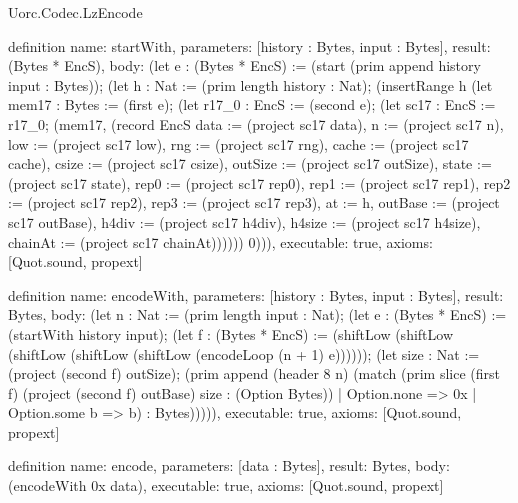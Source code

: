 \begin{lexlean}{Uorc.Codec.LzEncode}
\begin{semanticmodule}
definition{
  name: startWith,
  parameters: [history : Bytes, input : Bytes],
  result: (Bytes * EncS),
  body: (let e : (Bytes * EncS) := (start (prim append history input : Bytes)); (let h : Nat := (prim length history : Nat); (insertRange h (let mem17 : Bytes := (first e); (let r17_0 : EncS := (second e); (let sc17 : EncS := r17_0; (mem17, (record EncS {data := (project sc17 data), n := (project sc17 n), low := (project sc17 low), rng := (project sc17 rng), cache := (project sc17 cache), csize := (project sc17 csize), outSize := (project sc17 outSize), state := (project sc17 state), rep0 := (project sc17 rep0), rep1 := (project sc17 rep1), rep2 := (project sc17 rep2), rep3 := (project sc17 rep3), at := h, outBase := (project sc17 outBase), h4div := (project sc17 h4div), h4size := (project sc17 h4size), chainAt := (project sc17 chainAt)}))))) 0))),
  executable: true,
  axioms: [Quot.sound, propext]
}

definition{
  name: encodeWith,
  parameters: [history : Bytes, input : Bytes],
  result: Bytes,
  body: (let n : Nat := (prim length input : Nat); (let e : (Bytes * EncS) := (startWith history input); (let f : (Bytes * EncS) := (shiftLow (shiftLow (shiftLow (shiftLow (shiftLow (encodeLoop (n + 1) e)))))); (let size : Nat := (project (second f) outSize); (prim append (header 8 n) (match (prim slice (first f) (project (second f) outBase) size : (Option Bytes))
    | Option.none => 0x
    | Option.some b => b) : Bytes))))),
  executable: true,
  axioms: [Quot.sound, propext]
}

definition{
  name: encode,
  parameters: [data : Bytes],
  result: Bytes,
  body: (encodeWith 0x data),
  executable: true,
  axioms: [Quot.sound, propext]
}
\end{semanticmodule}
\end{lexlean}
